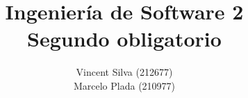 

%

\title{Ingeniería de Software 2\\Segundo obligatorio}
\author{Vincent Silva (212677) \\Marcelo Plada (210977) \\}




\maketitle


\newpage
%

\newpage
%

\newpage


